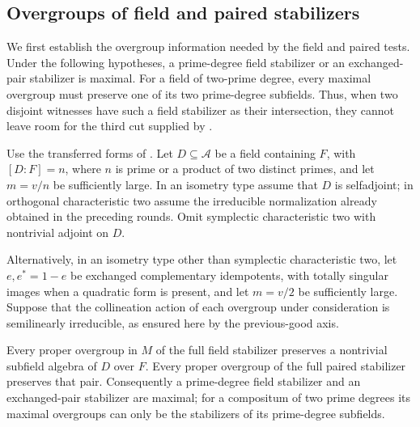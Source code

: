 \subsection{Overgroups of field and paired stabilizers}

We first establish the overgroup information needed by the field and
paired tests.  Under the following hypotheses, a prime-degree field
stabilizer or an exchanged-pair stabilizer is maximal.  For a field of
two-prime degree, every maximal overgroup must preserve one of its two
prime-degree subfields.  Thus, when two disjoint witnesses have such a
field stabilizer as their intersection, they cannot leave room for the
third cut supplied by .

\begin{proposition}
\label{fb:field-pair-overgroups}
Use the transferred forms of .
Let \(D\subseteq\mathcal A\) be a field containing \(F\), with \([D:F]=n\), where \(n\) is prime or a
product of two distinct primes, and let \(m=v/n\) be sufficiently large.
In an isometry type assume that \(D\) is selfadjoint; in orthogonal
characteristic two assume the irreducible normalization already obtained in the
preceding rounds.  Omit symplectic characteristic two with nontrivial adjoint
on \(D\).

Alternatively, in an isometry type other than symplectic characteristic two,
let \(e,e^*=1-e\) be exchanged complementary idempotents, with totally
singular images when a quadratic form is present, and let \(m=v/2\) be
sufficiently large.  Suppose that the collineation action of each overgroup
under consideration is semilinearly irreducible, as ensured here by the
previous-good axis.

Every proper overgroup in \(M\) of the full field stabilizer preserves a
nontrivial subfield algebra of \(D\) over \(F\).  Every proper overgroup of
the full paired stabilizer preserves that pair.  Consequently a prime-degree
field stabilizer and an exchanged-pair stabilizer are maximal; for a
compositum of two prime degrees its maximal overgroups can only be the
stabilizers of its prime-degree subfields.
\end{proposition}
